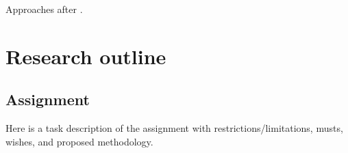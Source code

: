 Approaches after \autocite{ullapanchenkoMassentransportphaenomeneSchichtsystemenElektrolyseurs2019,majasanCorrelativeStudyMicrostructure2019,seipCorrelatingNanostructureFeatures2023,bhaskaranLBMStudiesPore2022}.

\chapter{Research outline}
\section{Assignment}
Here is a task description of the assignment with restrictions/limitations, musts, wishes, and proposed methodology.


